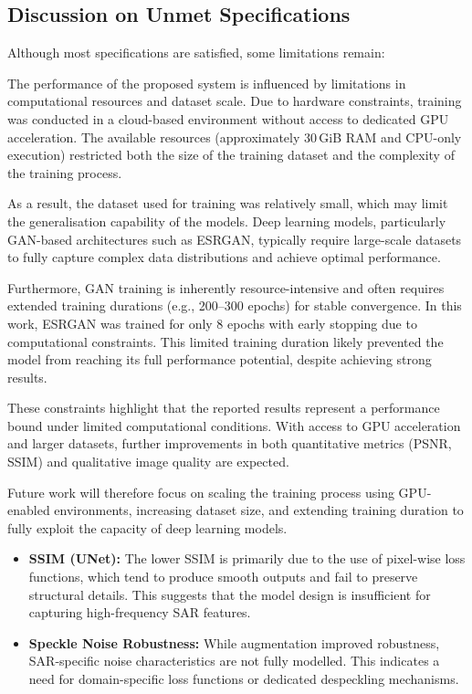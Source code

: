 \documentclass[conference]{IEEEtran}
\begin{document}
\subsection{Discussion on Unmet Specifications}

Although most specifications are satisfied, some limitations remain:

The performance of the proposed system is influenced by limitations in computational resources and dataset scale. Due to hardware constraints, training was conducted in a cloud-based environment without access to dedicated GPU acceleration. The available resources (approximately 30\,GiB RAM and CPU-only execution) restricted both the size of the training dataset and the complexity of the training process.

As a result, the dataset used for training was relatively small, which may limit the generalisation capability of the models. Deep learning models, particularly GAN-based architectures such as ESRGAN, typically require large-scale datasets to fully capture complex data distributions and achieve optimal performance.

Furthermore, GAN training is inherently resource-intensive and often requires extended training durations (e.g., 200–300 epochs) for stable convergence. In this work, ESRGAN was trained for only 8 epochs with early stopping due to computational constraints. This limited training duration likely prevented the model from reaching its full performance potential, despite achieving strong results.

These constraints highlight that the reported results represent a performance bound under limited computational conditions. With access to GPU acceleration and larger datasets, further improvements in both quantitative metrics (PSNR, SSIM) and qualitative image quality are expected.

Future work will therefore focus on scaling the training process using GPU-enabled environments, increasing dataset size, and extending training duration to fully exploit the capacity of deep learning models.

\begin{itemize}
    \item \textbf{SSIM (UNet):} The lower SSIM is primarily due to the use of pixel-wise loss functions, which tend to produce smooth outputs and fail to preserve structural details. This suggests that the model design is insufficient for capturing high-frequency SAR features.
    
    \item \textbf{Speckle Noise Robustness:} While augmentation improved robustness, SAR-specific noise characteristics are not fully modelled. This indicates a need for domain-specific loss functions or dedicated despeckling mechanisms.
\end{itemize}
\end{document}
